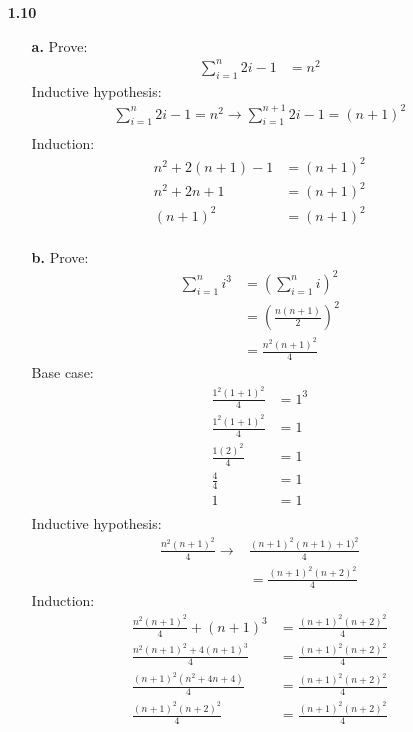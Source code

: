 \documentclass{article}
\begin{document}
\begin{enumerate}
\item[\textbf{1.10}]
 \begin{enumerate}
  \item[\textbf{a.}]
   Prove:
   \begin{align}
    \sum_{i=1}^n2i-1 &= n^2
   \end{align}
   Inductive hypothesis:
   \begin{align}
    \sum_{i=1}^n2i-1 = n^2 \rightarrow \sum_{i=1}^{n+1}2i-1 = (n+1)^2 \\
   \end{align}
   Induction:
   \begin{align}
    n^2 + 2(n+1) - 1 &= (n+1)^2 \\
    n^2 + 2n + 1 &= (n+1)^2 \\
    (n+1)^2 &= (n+1)^2 \\
   \end{align}
  \item[\textbf{b.}]
   Prove:
   \begin{align}
    \sum_{i=1}^ni^3 &= \left(\sum_{i=1}^ni\right)^2 \\
                    &= \left(\frac{n(n+1)}{2}\right)^2\\
                    &= \frac{n^2(n+1)^2}{4}
   \end{align}
   Base case:
   \begin{align}
    \frac{1^2(1+1)^2}{4} &= 1^3 \\
    \frac{1^2(1+1)^2}{4} &= 1 \\
    \frac{1(2)^2}{4}     &= 1\\
    \frac{4}{4}          &= 1\\
    1                    &= 1\\
   \end{align}
   Inductive hypothesis:
   \begin{align}
    \frac{n^2(n+1)^2}{4} \rightarrow &\frac{(n+1)^2(n+1)+1)^2}{4} \\
                         &= \frac{(n+1)^2(n+2)^2}{4}
   \end{align}
   Induction:
   \begin{align}
    \frac{n^2(n+1)^2}{4} + (n+1)^3 &= \frac{(n+1)^2(n+2)^2}{4} \\
    \frac{n^2(n+1)^2 + 4(n+1)^3}{4} &= \frac{(n+1)^2(n+2)^2}{4} \\
    \frac{(n+1)^2(n^2 + 4n+4)}{4} &= \frac{(n+1)^2(n+2)^2}{4} \\
    \frac{(n+1)^2(n+2)^2}{4} &= \frac{(n+1)^2(n+2)^2}{4}
   \end{align}
 \end{enumerate}

\end{enumerate}
\end{document}
